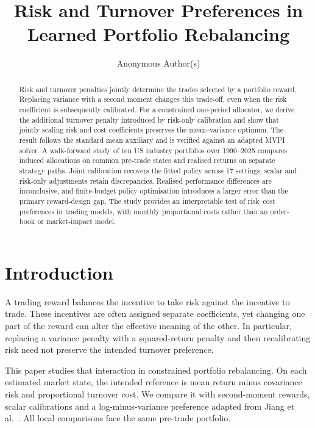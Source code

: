 \documentclass[sigconf,anonymous,review]{acmart}
\title{Risk and Turnover Preferences in Learned Portfolio Rebalancing}
\author{Anonymous Author(s)}
\begin{document}
\begin{abstract}
Risk and turnover penalties jointly determine the trades selected by a portfolio reward. Replacing variance with a second moment changes this trade-off, even when the risk coefficient is subsequently calibrated. For a constrained one-period allocator, we derive the additional turnover penalty introduced by risk-only calibration and show that jointly scaling risk and cost coefficients preserves the mean--variance optimum. The result follows the standard mean auxiliary and is verified against an adapted MVPI solver. A walk-forward study of ten US industry portfolios over 1990--2025 compares induced allocations on common pre-trade states and realised returns on separate strategy paths. Joint calibration recovers the fitted policy across 17 settings; scalar and risk-only adjustments retain discrepancies. Realised performance differences are inconclusive, and finite-budget policy optimisation introduces a larger error than the primary reward-design gap. The study provides an interpretable test of risk--cost preferences in trading models, with monthly proportional costs rather than an order-book or market-impact model.
\end{abstract}
\maketitle

\section{Introduction}
A trading reward balances the incentive to take risk against the incentive to trade. These incentives are often assigned separate coefficients, yet changing one part of the reward can alter the effective meaning of the other. In particular, replacing a variance penalty with a squared-return penalty and then recalibrating risk need not preserve the intended turnover preference.

This paper studies that interaction in constrained portfolio rebalancing. On each estimated market state, the intended reference is mean return minus covariance risk and proportional turnover cost. We compare it with second-moment rewards, scalar calibrations and a log-minus-variance preference adapted from Jiang et al.\ \cite{jiang2025}. All local comparisons face the same pre-trade portfolio.
\end{document}
